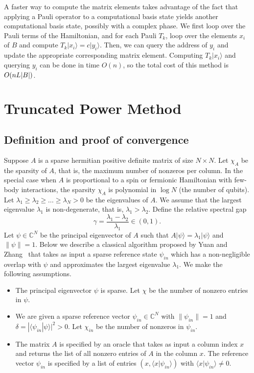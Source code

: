 \documentclass[
  reprint,            %
  amsmath,amssymb,
  aps,
  superscriptaddress, %
  longbibliography
]{revtex4-2}
\theoremstyle{definition}
\DeclarePairedDelimiter\abs{\lvert}{\rvert}
\newcommand{\ket}[1]{| #1 \rangle}
\newcommand{\CC}{\mathbb{C}}
\newcommand{\la}{\langle}
\newcommand{\ra}{\rangle}
\begin{document}
A faster way to compute the matrix elements takes advantage of the fact that applying a Pauli operator to a computational basis state yields another computational basis state, possibly with a complex phase. We first loop over the Pauli terms of the Hamiltonian, and for each Pauli $T_k$, loop over the elements $x_i$ of $B$ and compute $T_k\ket{x_i} = c\ket{y_i}$. Then, we can query the address of $y_i$ and update the appropriate corresponding matrix element. Computing $T_k\ket{x_i}$ and querying $y_i$ can be done in time $O(n)$, so the total cost of this method is $O(nL\abs{B})$.

\section{Truncated Power Method}
\label{app:tpower}

\subsection{Definition and proof of convergence}
\label{sapp:tpower_convergence}

Suppose $A$ is a sparse  hermitian positive definite matrix of size $N\times N$.
Let $\chi_A$ be the sparsity of $A$, that is, the maximum number of nonzeros per column.
In the special case when $A$ is proportional to a spin or fermionic Hamiltonian with few-body interactions, the sparsity $\chi_A$
is polynomial in $\log{N}$ (the number of qubits).
Let $\lambda_1\ge \lambda_2 \ge \ldots \ge \lambda_N> 0$ be the eigenvalues of $A$.
We assume that the largest eigenvalue $\lambda_1$ is non-degenerate, that is,
$\lambda_1>\lambda_2$.
Define
the relative spectral gap
\[
\gamma = \frac{\lambda_1-\lambda_2}{\lambda_1} \in (0,1).
\]
Let $\psi\in \CC^N$ be the  principal eigenvector of $A$ such that 
$A|\psi\ra=\lambda_1|\psi\ra$ and $\|\psi\|=1$.
Below  we describe a classical algorithm proposed by Yuan and Zhang~\cite{yuan2013truncated} that takes as input a sparse reference state 
$\psi_{in}$
which has a non-negligible overlap with $\psi$ and
approximates the largest eigenvalue $\lambda_1$.
We make the following assumptions.
\begin{itemize}
\item
The principal eigenvector $\psi$ is sparse. Let $\chi$ be the number of nonzero entries in $\psi$.
\item
We are given a sparse reference vector $\psi_{in}\in \CC^N$  with $\|\psi_{in}\|=1$ and 
$\delta=|\la \psi_{in}|\psi\ra|^2>0$.  Let $\chi_{in}$ be the number of nonzeros in $\psi_{in}$.
\item The matrix $A$ is specified by an oracle that takes as input a column index $x$ and returns the list 
of all nonzero entries of $A$ in the column $x$. The reference vector $\psi_{in}$ is specified by a list of entries $(x,\la x|\psi_{in}\ra)$ with $\la x|\psi_{in}\ra\ne 0$.
\end{itemize}
\end{document}
